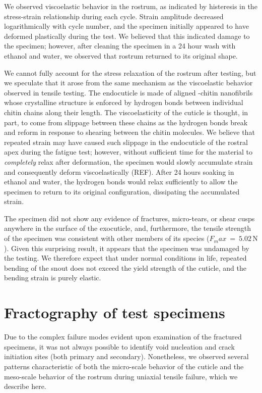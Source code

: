 \documentclass[twocolumn, linenumbers, superscriptaddress, nofootinbib]{revtex4-1}
\begin{document}
		We observed viscoelastic behavior in the rostrum, as indicated by histeresis in the stress-strain relationship during each cycle.
		Strain amplitude decreased logarithmically with cycle number, and the specimen initially appeared to have deformed plastically during the test.
		We believed that this indicated damage to the specimen; however, after cleaning the specimen in a 24 hour wash with ethanol and water, we observed that rostrum returned to its original shape.
		
		We cannot fully account for the stress relaxation of the rostrum after testing, but we speculate that it arose from the same mechanism as the viscoelastic behavior observed in tensile testing.
		The endocuticle is made of aligned \textalpha-chitin nanofibrils whose crystalline structure is enforced by hydrogen bonds between individual chitin chains along their length.
		The viscoelasticity of the cuticle is thought, in part, to come from slippage between these chains as the hydrogen bonds break and reform in response to shearing between the chitin molecules.
		We believe that repeated strain may have caused such slippage in the endocuticle of the rostral apex during the fatigue test; however, without sufficient time for the material to \textit{completely} relax after deformation, the specimen would slowly accumulate strain and consequently deform viscoelastically (REF).
		After 24 hours soaking in ethanol and water, the hydrogen bonds would relax sufficiently to allow the specimen to return to its original configuration, dissipating the accumulated strain.
		
		The specimen did not show any evidence of fractures, micro-tears, or shear cusps anywhere in the surface of the exocuticle, and, furthermore, the tensile strength of the specimen was consistent with other members of its species ($F_max~=~5.02\,\text{N}$).
		Given this surprising result, it appears that the specimen was undamaged by the testing.
		We therefore expect that under normal conditions in life, repeated bending of the snout does not exceed the yield strength of the cuticle, and the bending strain is purely elastic.
			
	\section{Fractography of test specimens}
		Due to the complex failure modes evident upon examination of the fractured specimens, it was not always possible to identify void nucleation and crack initiation sites (both primary and secondary).
		Nonetheless, we observed several patterns characteristic of both the micro-scale behavior of the cuticle and the meso-scale behavior of the rostrum during uniaxial tensile failure, which we describe here.
		
\end{document}
